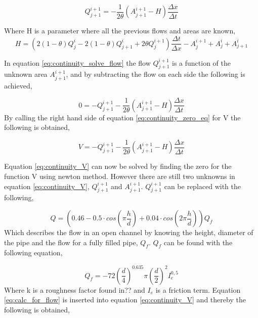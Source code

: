 \begin{equation}\label{eq:continuity_solve_flow}
	Q_{j+1}^{i+1} = - \frac{1}{2\theta}\left(A_{j+1}^{i+1}-H\right)\frac{\Delta x}{\Delta t}
\end{equation}

Where H is a parameter where all the previous flows and areas are known,
\begin{equation}
	H = \left(2(1-\theta)Q_j^i-2(1-\theta)Q_{j+1}^i+2\theta Q_j^{i+1}\right)\frac{\Delta t}{\Delta x}- A_{j}^{i+1}+A_j^i+A_{j+1}^i
\end{equation}


In equation \ref{eq:continuity_solve_flow} the flow $Q_{j+1}^{i+1}$ is a function of the unknown area $A_{j+1}^{i+1}$, and by subtracting the flow on each side the following is achieved,

\begin{equation}\label{eq:continuity_zero_eq}
		0=-Q_{j+1}^{i+1}  - \frac{1}{2\theta}\left(A_{j+1}^{i+1}-H\right)\frac{\Delta x}{\Delta t}
\end{equation}
By calling the right hand side of equation \ref{eq:continuity_zero_eq} for V the following is obtained,

\begin{equation}\label{eq:continuity_V}
		V=-Q_{j+1}^{i+1}  - \frac{1}{2\theta}\left(A_{j+1}^{i+1}-H\right)\frac{\Delta x}{\Delta t}
\end{equation}

Equation \ref{eq:continuity_V} can now be solved by finding the zero for the function V using newton method. However there are still two unknowns in equation \ref{eq:continuity_V}, $Q_{j+1}^{i+1}$ and $A_{j+1}^{i+1}$. $Q_{j+1}^{i+1}$ can be replaced with the following,

\begin{equation}\label{eq:calc_for_flow}
 	Q = \left(0.46-0.5 \cdot cos\left(\pi \frac{h}{d}\right)+0.04\cdot cos\left(2\pi\frac{h}{d}\right)\right)Q_f
\end{equation}
Which describes the flow in an open channel by knowing the height, diameter of the pipe and the flow for a fully filled pipe, $Q_f$. $Q_f$ can be found with the following equation,

\begin{equation}\label{eq:qf_for_flow}
	Q_f =-72\left(\frac{d}{4}\right)^{0.635}\pi\left(\frac{d}{2}\right)^2I_e^{0,5}%
\end{equation}
Where k is a roughness factor found in??  and $I_e$ is a friction term. Equation \ref{eq:calc_for_flow} is inserted into equation \ref{eq:continuity_V} and thereby the following is obtained,

